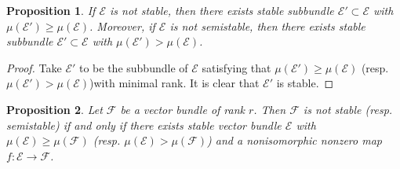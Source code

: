 \documentclass{ctexart}
\newtheorem{proposition}{Proposition}[section]
\begin{document}
\begin{proposition}
    If $\mathcal{E}$ is not stable, then there exists stable subbundle $\mathcal{E}' \subset \mathcal{E}$ with $\mu(\mathcal{E}') \ge \mu(\mathcal{E})$.
    Moreover, if $\mathcal{E}$ is not semistable, then there exists stable subbundle $\mathcal{E}' \subset \mathcal{E}$ with $\mu(\mathcal{E}') > \mu(\mathcal{E})$.
    \label{Proposition 6.6}
\end{proposition}
\begin{proof}
    Take $\mathcal{E}'$ to be the subbundle of $\mathcal{E}$ satisfying that $\mu(\mathcal{E}') \ge \mu(\mathcal{E})$ (resp. $\mu(\mathcal{E}') > \mu(\mathcal{E})$)with minimal rank.
    It is clear that $\mathcal{E}'$ is stable.
\end{proof}
\begin{proposition}
    Let $\mathcal{F}$ be a vector bundle of rank $r$.
    Then $\mathcal{F}$ is not stable (resp. semistable) if and only if there exists stable vector bundle $\mathcal{E}$ with $\mu(\mathcal{E}) \ge \mu(\mathcal{F})$ (resp. $\mu(\mathcal{E}) > \mu(\mathcal{F})$) and a nonisomorphic nonzero map $f: \mathcal{E} \rightarrow \mathcal{F}$.
    \label{Proposition 6.7}
\end{proposition}
\end{document}
